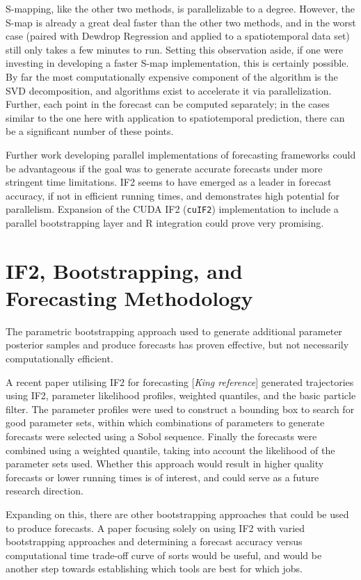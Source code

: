 	S-mapping, like the other two methods, is parallelizable to a degree. However, the S-map is already a great deal faster than the other two methods, and in the worst case (paired with Dewdrop Regression and applied to a spatiotemporal data set) still only takes a few minutes to run. Setting this observation aside, if one were investing in developing a faster S-map implementation, this is certainly possible. By far the most computationally expensive component of the algorithm is the SVD decomposition, and algorithms exist to accelerate it via parallelization. Further, each point in the forecast can be computed separately; in the cases similar to the one here with application to spatiotemporal prediction, there can be a significant number of these points.

	Further work developing parallel implementations of forecasting frameworks could be advantageous if the goal was to generate accurate forecasts under more stringent time limitations. IF2 seems to have emerged as a leader in forecast accuracy, if not in efficient running times, and demonstrates high potential for parallelism. Expansion of the CUDA IF2 (\texttt{cuIF2}) implementation to include a parallel bootstrapping layer and R integration could prove very promising.


\section{IF2, Bootstrapping, and Forecasting Methodology}

	The parametric bootstrapping approach used to generate additional parameter posterior samples and produce forecasts has proven effective, but not necessarily computationally efficient.

	A recent paper utilising IF2 for forecasting [\textit{King reference}] generated trajectories using IF2, parameter likelihood profiles, weighted quantiles, and the basic particle filter. The parameter profiles were used to construct a bounding box to search for good parameter sets, within which combinations of parameters to generate forecasts were selected using a Sobol sequence. Finally the forecasts were combined using a weighted quantile, taking into account the likelihood of the parameter sets used. Whether this approach would result in higher quality forecasts or lower running times is of interest, and could serve as a future research direction. 

	Expanding on this, there are other bootstrapping approaches that could be used to produce forecasts. A paper focusing solely on using IF2 with varied bootstrapping approaches and determining a forecast accuracy versus computational time trade-off curve of sorts would be useful, and would be another step towards establishing which tools are best for which jobs.



